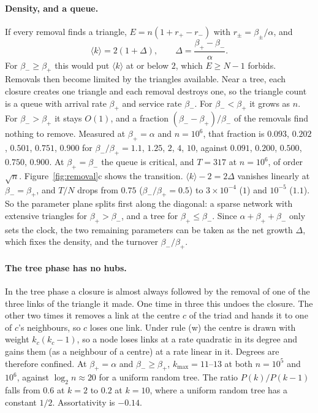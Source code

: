 \documentclass[aps,pre,twocolumn,superscriptaddress,floatfix,nofootinbib]{revtex4-2}
\begin{document}
\paragraph*{Density, and a queue.}
If every removal finds a triangle, $E=n(1+r_+-r_-)$ with $r_\pm=\beta_\pm/\alpha$,
and
\begin{equation}
  \langle k\rangle=2(1+\Delta),\qquad \Delta=\frac{\beta_+-\beta_-}{\alpha}.
  \label{eq:kmeanpm}
\end{equation}
For $\beta_-\ge\beta_+$ this would put $\langle k\rangle$ at or below $2$, which
$E\ge N-1$ forbids. Removals then become limited by the triangles available.
Near a tree, each closure creates one triangle and each removal destroys one, so
the triangle count is a queue with arrival rate $\beta_+$ and service rate
$\beta_-$. For $\beta_-<\beta_+$ it grows as $n$. For $\beta_->\beta_+$ it
stays $O(1)$, and a fraction $(\beta_--\beta_+)/\beta_-$ of the removals find
nothing to remove. Measured at $\beta_+=\alpha$ and $n=10^6$, that fraction is
$0.093$, $0.202$, $0.501$, $0.751$, $0.900$ for $\beta_-/\beta_+=1.1$, $1.25$, $2$,
$4$, $10$, against $0.091$, $0.200$, $0.500$, $0.750$, $0.900$. At $\beta_+=\beta_-$
the queue is critical, and $T=317$ at $n=10^6$, of order $\sqrt n$.
Figure~\ref{fig:removal}c shows the transition. $\langle k\rangle-2=2\Delta$
vanishes linearly at $\beta_-=\beta_+$, and $T/N$ drops from $0.75$
($\beta_-/\beta_+=0.5$) to $3\times10^{-4}$ ($1$) and $10^{-5}$ ($1.1$).
So the parameter plane splits first along the diagonal: a sparse network with
extensive triangles for $\beta_+>\beta_-$, and a tree for $\beta_+\le\beta_-$.
Since $\alpha+\beta_++\beta_-$ only sets the clock, the two remaining
parameters can be taken as the net growth $\Delta$, which fixes the density,
and the turnover $\beta_-/\beta_+$.

\paragraph*{The tree phase has no hubs.}
In the tree phase a closure is almost always followed by the removal of one of
the three links of the triangle it made. One time in three this undoes the
closure. The other two times it removes a link at the centre $c$ of the triad
and hands it to one of $c$'s neighbours, so $c$ loses one link. Under rule (w)
the centre is drawn with weight $k_c(k_c-1)$, so a node loses links at a rate
quadratic in its degree and gains them (as a neighbour of a centre) at a rate
linear in it. Degrees are therefore confined. At $\beta_+=\alpha$ and
$\beta_-\ge\beta_+$, $k_{\max}=11$--$13$ at both $n=10^5$ and $10^6$, against
$\log_2 n\approx20$ for a uniform random tree. The ratio $P(k)/P(k-1)$ falls
from $0.6$ at $k=2$ to $0.2$ at $k=10$, where a uniform random tree has a
constant $1/2$. Assortativity is $-0.14$.
\end{document}

